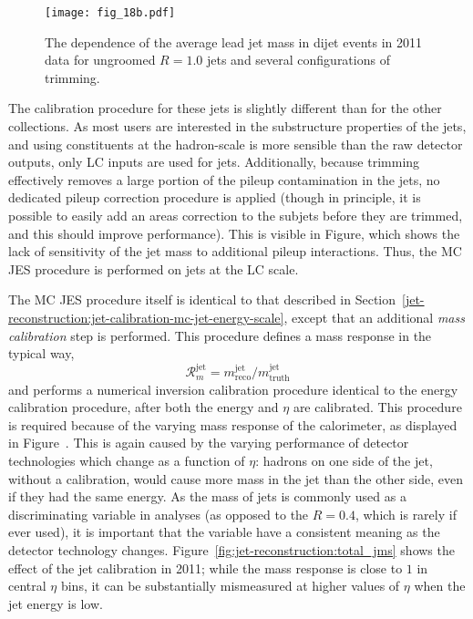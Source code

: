 \begin{figure}
\centering
\texttt{[image: fig\_18b.pdf]}
\label{fig:jet-reconstruction:pileup_large}
\caption{The dependence of the average lead jet mass in dijet events in 2011 data for ungroomed \antikt $R=1.0$ jets and several configurations of trimming.}
\end{figure}


The calibration procedure for these \largeR jets is slightly different than for the other collections. As most users are interested in the substructure properties of the jets, and using constituents at the hadron-scale is more sensible than the raw detector outputs, only LC inputs are used for \largeR jets. Additionally, because trimming effectively removes a large portion of the pileup contamination in the jets, no dedicated pileup correction procedure is applied (though in principle, it is possible to easily add an areas correction to the subjets before they are trimmed, and this should improve performance). This is visible in Figure, which shows the lack of sensitivity of the jet mass to additional pileup interactions. Thus, the MC JES procedure is performed on jets at the LC scale.

The MC JES procedure itself is identical to that described in Section~\ref{jet-reconstruction:jet-calibration-mc-jet-energy-scale}, except that an additional \textit{mass calibration} step is performed. This procedure defines a mass response in the typical way,
%
\begin{equation}
\mathcal{R}^{\mathrm{jet}}_m = m^{\mathrm{jet}}_{\mathrm{reco}} /  m^{\mathrm{jet}}_{\mathrm{truth}} 
\end{equation}
%
and performs a numerical inversion calibration procedure identical to the energy calibration procedure, after both the energy and $\eta$ are calibrated. This procedure is required because of the varying mass response of the calorimeter, as displayed in Figure~. This is again caused by the varying performance of detector technologies which change as a function of $\eta$: hadrons on one side of the jet, without a calibration, would cause more mass in the jet than the other side, even if they had the same energy. As the mass of \largeR jets is commonly used as a discriminating variable in analyses (as opposed to the $R=0.4$, which is rarely if ever used), it is important that the variable have a consistent meaning as the detector technology changes. Figure~\ref{fig:jet-reconstruction:total_jms} shows the effect of the jet calibration in 2011; while the mass response is close to $1$ in central $\eta$ bins, it can be substantially mismeasured at higher values of $\eta$ when the jet energy is low.

